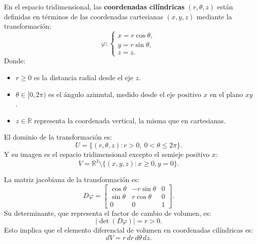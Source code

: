 \begin{definición}
    En el espacio tridimensional, las \textbf{coordenadas cilíndricas} $(r, \theta, z)$ están definidas en términos de las coordenadas cartesianas $(x, y, z)$ mediante la transformación:  
    $$ 
    \varphi:
    \begin{cases} 
        x = r\cos\theta, \\ 
        y = r\sin\theta, \\ 
        z = z.
    \end{cases}
    $$  
    Donde:  
    \begin{itemize}
        \item $r \geq 0$ es la distancia radial desde el eje $z$.
        \item $\theta \in [0, 2\pi)$ es el ángulo azimutal, medido desde el eje positivo $x$ en el plano $xy$.
        \item $z \in \mathbb{R}$ representa la coordenada vertical, la misma que en cartesianas.
    \end{itemize}

    El dominio de la transformación es:  
    $$
    U = \{(r, \theta, z) : r > 0, \ 0 < \theta \leq 2\pi\}.
    $$  
    Y su imagen es el espacio tridimensional excepto el semieje positivo $x$:  
    $$
    V = \mathbb{R}^3 \setminus \{ (x,y,z) : x \geq 0, y = 0\}.
    $$  

    La matriz jacobiana de la transformación es:  
    $$
    D\varphi =
    \begin{bmatrix}
        \cos\theta & -r\sin\theta & 0 \\  
        \sin\theta & r\cos\theta & 0 \\  
        0 & 0 & 1  
    \end{bmatrix}.
    $$  
    Su determinante, que representa el factor de cambio de volumen, es:  
    $$ 
    \left| \det(D\varphi) \right| = r > 0.
    $$  
    Esto implica que el elemento diferencial de volumen en coordenadas cilíndricas es:  
    $$ 
    dV = r \, dr \, d\theta \, dz.
    $$  
\end{definición}

